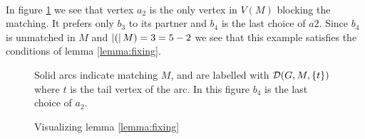 \paragraph{}
In figure \ref{figure:fixing} we see that vertex $a_2$ is the only vertex in $V(M)$ blocking the matching. It prefers only $b_3$ to its partner and $b_4$ is the last choice of $a2$. Since $b_4$ is unmatched in $M$ and $\left|(\right|M) = 3 = 5 - 2$ we see that this example satisfies the conditions of lemma \ref{lemma:fixing}.
\begin{figure}[h]\label{figure:fixing}
\centering
{}
\caption{Visualizing lemma \ref{lemma:fixing}}
\small
\begin{flushleft}
Solid arcs indicate matching $M$, and are labelled with $\mathcal{D}(G,M,\{t\})$ where $t$ is the tail vertex of the arc. In this figure $b_4$ is the last choice of $a_2$.
\end{flushleft}
\end{figure}
